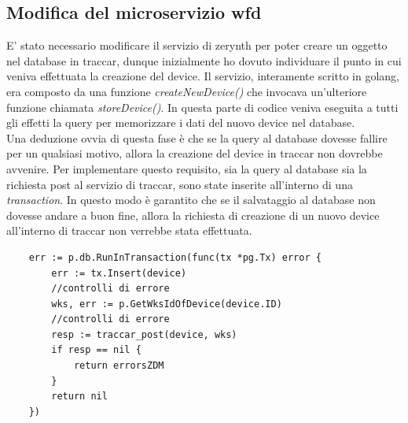 \documentclass[a4paper,titlepage,12pt]{book}
\begin{document}
\subsection{\sffamily
Modifica del microservizio wfd}
E' stato necessario modificare il servizio di zerynth per poter creare un oggetto nel database in traccar, dunque inizialmente ho dovuto individuare il punto in cui veniva effettuata la creazione del device. Il servizio, interamente scritto in golang, era composto da una funzione \textit{createNewDevice()} che invocava un'ulteriore funzione chiamata \textit{storeDevice()}. In questa parte di codice veniva eseguita a tutti gli effetti la query per memorizzare i dati del nuovo device nel database.\\
Una deduzione ovvia di questa fase è che se la query al database dovesse fallire per un qualsiasi motivo, allora la creazione del device in traccar non dovrebbe avvenire. Per implementare questo requisito, sia la query al database sia la richiesta post al servizio di traccar, sono state inserite all'interno di una \textit{transaction}. In questo modo è garantito che se il salvataggio al database non dovesse andare a buon fine, allora la richiesta di creazione di un nuovo device all'interno di traccar non verrebbe stata effettuata.\\
\begin{verbatim}
	err := p.db.RunInTransaction(func(tx *pg.Tx) error {
		err := tx.Insert(device) 
		//controlli di errore
		wks, err := p.GetWksIdOfDevice(device.ID)
		//controlli di errore
		resp := traccar_post(device, wks)
		if resp == nil {
			return errorsZDM
		}
		return nil
	})


\end{verbatim}
\end{document}
